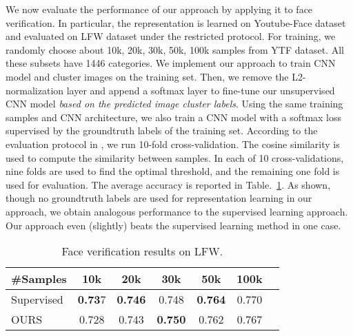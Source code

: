 \documentclass[10pt,twocolumn,letterpaper]{article}
\begin{document}
We now evaluate the performance of our approach by applying {it to} face verification. {In particular, the representation {is} learned on Youtube-Face dataset and evaluated on LFW dataset \cite{huang2007labeled} under the restricted protocol. For training, we randomly choose about {10k, 20k, 30k, 50k, 100k} samples from YTF dataset. All these subsets have 1446 categories. We implement our approach to train CNN model and cluster images on the training set. Then, we remove the L2-normalization layer and append a softmax layer to fine-tune our unsupervised CNN model \emph{based on the predicted image cluster labels}.} Using the same training samples and CNN architecture, we also train a CNN model with a softmax loss {supervised by the groundtruth labels of the training set}. {According to the evaluation protocol in \cite{huang2007labeled}}, we run 10-fold cross-validation. The cosine similarity is used {to compute the similarity between samples. In each of 10 cross-validations, nine folds are used to find the optimal threshold, and the remaining one fold is used for evaluation. The average accuracy is reported in Table.~\ref{TB_LFW_Perf}}. As shown, though no {groundtruth labels are used for representation learning in our approach}, we obtain analogous performance to the supervised learning approach. {Our approach even (slightly) beats the supervised learning method in one case.}

\begin{table}
\caption{{Face verification results on LFW.}}
\vspace{-15pt}
\center
\small
\begin{tabular}{lcccccc}
  \toprule
  \#Samples      & 10k    & 20k    & 30k     & 50k   & 100k     \\   
  \midrule 
   Supervised    & \textbf{0.73}7  & \textbf{0.746}  &  0.748  & \textbf{0.764} & 0.770 \\  
   OURS          & 0.728  & 0.743  & \textbf{0.750}  & 0.762 & 0.767    \\
   \bottomrule
\end{tabular}
\label{TB_LFW_Perf}
\end{table}
\end{document}
